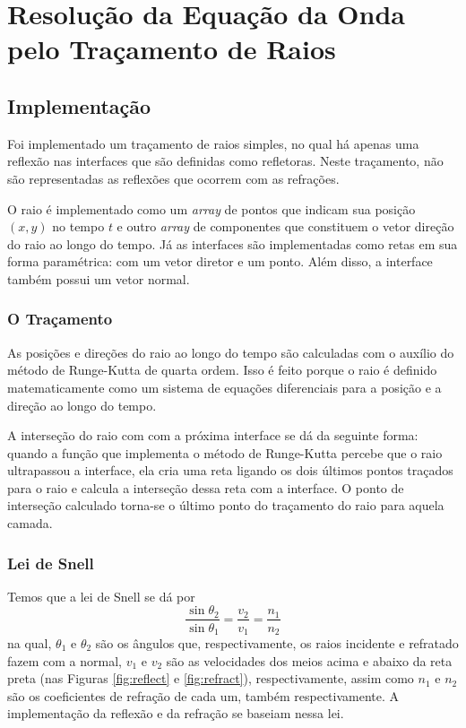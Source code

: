             
    \section{Resolução da Equação da Onda pelo Traçamento de Raios}
    
        \subsection{Implementação}
        
            Foi implementado um traçamento de raios simples, no qual há apenas uma reflexão nas interfaces que são definidas como refletoras. Neste traçamento, não são representadas as reflexões que ocorrem com as refrações.
            
            O raio é implementado como um \textit{array} de pontos que indicam sua posição $(x, y)$ no tempo $t$ e outro \textit{array} de componentes que constituem o vetor direção do raio ao longo do tempo. Já as interfaces são implementadas como retas em sua forma paramétrica: com um vetor diretor e um ponto. Além disso, a interface também possui um vetor normal.
        
            \subsubsection{O Traçamento}
            
                As posições e direções do raio ao longo do tempo são calculadas com o auxílio do método de Runge-Kutta de quarta ordem. Isso é feito porque o raio é definido matematicamente como um sistema de equações diferenciais para a posição e a direção ao longo do tempo.
                
                A interseção do raio com com a próxima interface se dá da seguinte forma: quando a função que implementa o método de Runge-Kutta percebe que o raio ultrapassou a interface, ela cria uma reta ligando os dois últimos pontos traçados para o raio e calcula a interseção dessa reta com a interface. O ponto de interseção calculado torna-se o último ponto do traçamento do raio para aquela camada.
            
            \subsubsection{Lei de Snell}
            
                Temos que a lei de Snell se dá por
                \begin{equation*}
                    \dfrac{\sin{\theta_2}}{\sin{\theta_1}} = \dfrac{v_2}{v_1} = \dfrac{n_1}{n_2}
                \end{equation*}
                na qual, $\theta_1$ e $\theta_2$ são os ângulos que, respectivamente, os raios incidente e refratado fazem com a normal, $v_1$ e $v_2$ são as velocidades dos meios acima e abaixo da reta preta (nas Figuras \ref{fig:reflect} e \ref{fig:refract}), respectivamente, assim como $n_1$ e $n_2$ são os coeficientes de refração de cada um, também respectivamente. A implementação da reflexão e da refração se baseiam nessa lei.
                
